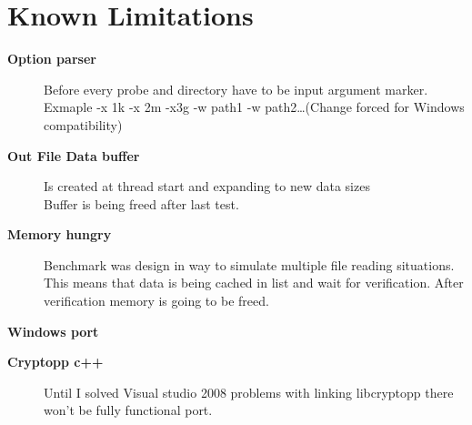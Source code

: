 \hypertarget{KnownIssues}{
\section{Known Limitations}
\label{KnownLimitations}
}

\begin{description}
\item [\textbf{Option parser}] Before every probe and directory have to be input argument marker.\\Exmaple -x 1k -x 2m -x3g -w path1 -w path2\ldots (Change forced for Windows compatibility)
\item [\textbf{Out File Data buffer}] Is created at thread start and expanding to new data sizes\\ Buffer is being freed after last test.
\item [\textbf{Memory hungry} ] Benchmark was design in way to simulate multiple file reading situations.\\
This means that data is being cached in list and wait for verification. After verification memory is going to be freed.
\end{description}
\textbf{Windows port}
\begin{description}
\item [\textbf{Cryptopp c++}] Until I solved Visual studio 2008 problems with linking libcryptopp there won't be fully functional port.
\end{description}